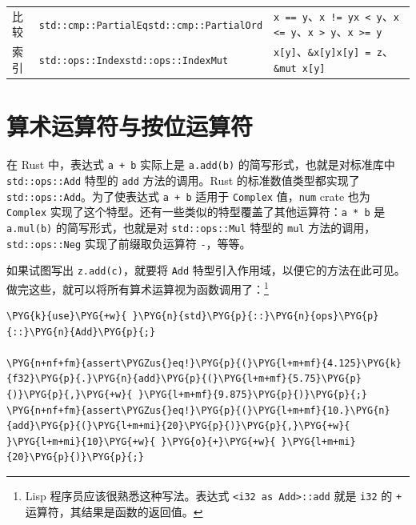 \begin{tabularx}{\textwidth}{@{}>{\hsize=0.371\hsize\raggedright\arraybackslash}X>{\hsize=1.315\hsize\raggedright\arraybackslash}X>{\hsize=1.315\hsize\raggedright\arraybackslash}X@{}}
比较 & \texttt{std::cmp::PartialEq}\newline{}\texttt{std::cmp::PartialOrd} & \texttt{x == y}、\texttt{x != y}\newline{}\texttt{x < y}、\texttt{x <= y}、\texttt{x > y}、\texttt{x >= y} \\
索引 & \texttt{std::ops::Index}\newline{}\texttt{std::ops::IndexMut} & \texttt{x[y]}、\texttt{\&x[y]}\newline{}\texttt{x[y] = z}、\texttt{\&mut x[y]} \\
\end{tabularx}
\myTableEnd

\section{算术运算符与按位运算符}

在 Rust 中，表达式 \texttt{a + b} 实际上是 \texttt{a.add(b)} 的简写形式，也就是对标准库中 \texttt{std::ops::Add} 特型的 \texttt{add} 方法的调用。Rust 的标准数值类型都实现了 \texttt{std::ops::Add}。为了使表达式 \texttt{a + b} 适用于 \texttt{Complex} 值，\texttt{num} crate 也为 \texttt{Complex} 实现了这个特型。还有一些类似的特型覆盖了其他运算符：\texttt{a * b} 是 \texttt{a.mul(b)} 的简写形式，也就是对 \texttt{std::ops::Mul} 特型的 \texttt{mul} 方法的调用，\texttt{std::ops::Neg} 实现了前缀取负运算符 \texttt{-}，等等。

如果试图写出 \texttt{z.add(c)}，就要将 \texttt{Add} 特型引入作用域，以便它的方法在此可见。做完这些，就可以将所有算术运算视为函数调用了：\footnote{Lisp 程序员应该很熟悉这种写法。表达式 \texttt{<i32 as Add>::add} 就是 \texttt{i32} 的 \texttt{+} 运算符，其结果是函数的返回值。}

\begin{Verbatim}[commandchars=\\\{\},breaklines=true,breakanywhere=true,fontsize=\codefont,xleftmargin=17bp]
\PYG{k}{use}\PYG{+w}{ }\PYG{n}{std}\PYG{p}{::}\PYG{n}{ops}\PYG{p}{::}\PYG{n}{Add}\PYG{p}{;}

\PYG{n+nf+fm}{assert\PYGZus{}eq!}\PYG{p}{(}\PYG{l+m+mf}{4.125}\PYG{k}{f32}\PYG{p}{.}\PYG{n}{add}\PYG{p}{(}\PYG{l+m+mf}{5.75}\PYG{p}{)}\PYG{p}{,}\PYG{+w}{ }\PYG{l+m+mf}{9.875}\PYG{p}{)}\PYG{p}{;}
\PYG{n+nf+fm}{assert\PYGZus{}eq!}\PYG{p}{(}\PYG{l+m+mf}{10.}\PYG{n}{add}\PYG{p}{(}\PYG{l+m+mi}{20}\PYG{p}{)}\PYG{p}{,}\PYG{+w}{ }\PYG{l+m+mi}{10}\PYG{+w}{ }\PYG{o}{+}\PYG{+w}{ }\PYG{l+m+mi}{20}\PYG{p}{)}\PYG{p}{;}
\end{Verbatim}

